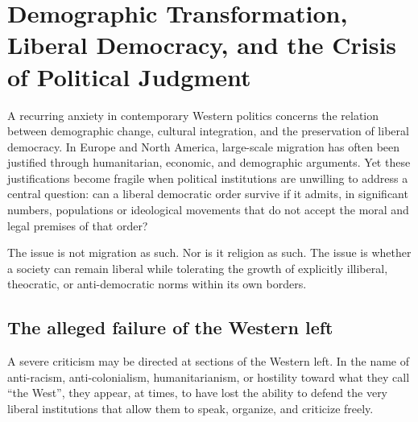 \chapter{Demographic Transformation, Liberal Democracy, and the Crisis of Political Judgment}

\begingroup

\begin{abstract}
This essay offers a polemical critique of contemporary Western immigration policy, with particular attention to the perceived failure of political elites to distinguish between ordinary migration, successful integration, and the importation of illiberal or theocratic political cultures. The argument is not that migrants, Muslims, or any religious community should be treated as collectively guilty. Rather, it is that liberal democracies may endanger themselves when they refuse to defend the cultural, legal, and institutional preconditions of their own survival.
\end{abstract}


A recurring anxiety in contemporary Western politics concerns the relation between demographic change, cultural integration, and the preservation of liberal democracy. In Europe and North America, large-scale migration has often been justified through humanitarian, economic, and demographic arguments. Yet these justifications become fragile when political institutions are unwilling to address a central question: can a liberal democratic order survive if it admits, in significant numbers, populations or ideological movements that do not accept the moral and legal premises of that order?

The issue is not migration as such. Nor is it religion as such. The issue is whether a society can remain liberal while tolerating the growth of explicitly illiberal, theocratic, or anti-democratic norms within its own borders.

\section{The alleged failure of the Western left}

A severe criticism may be directed at sections of the Western left. In the name of anti-racism, anti-colonialism, humanitarianism, or hostility toward what they call ``the West'', they appear, at times, to have lost the ability to defend the very liberal institutions that allow them to speak, organize, and criticize freely.

